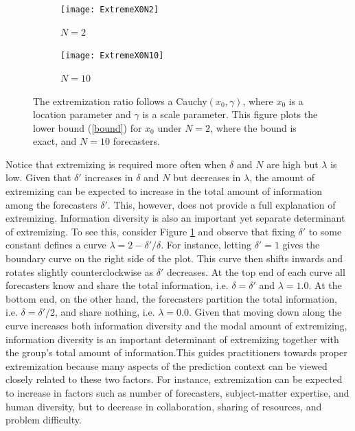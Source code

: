 \documentclass[11pt]{article}
\theoremstyle{definition}
\theoremstyle{definition}
\begin{document}
\begin{figure}[t]
\hspace{-1.2em}
    \centering
    \begin{subfigure}[b]{0.48\textwidth}
        \texttt{[image: ExtremeX0N2]}
\caption{$N = 2$}	
\label{xOracle2}
    \end{subfigure}%
    \begin{subfigure}[b]{0.48\textwidth}
        \texttt{[image: ExtremeX0N10]}
\caption{$N = 10$}	
\label{xOracle10}
    \end{subfigure}%
    \caption{ The extremization ratio follows a 
Cauchy$(x_0, \gamma)$, where $x_0$ is a location parameter and $\gamma$ 
is a scale parameter.  This figure plots the lower bound (\ref{bound}) for $x_0$ under $N = 2$, where the bound is exact, and $N = 10$ forecasters.}
        \label{LevelplotsOracle}
\end{figure}
 Notice that extremizing is required more often when $\delta$ and $N$
are high but $\lambda$ is low.  Given that $\delta'$ increases in
$\delta$ and $N$ but decreases in $\lambda$, the amount of extremizing
can be expected to increase in the total amount of information among
the forecasters $\delta'$.  This, however, does not provide a full
explanation of extremizing.  Information diversity is also an
important yet separate determinant of extremizing.  To see this,
consider Figure \ref{xOracle2} and observe that fixing $\delta'$ to
some constant defines a curve $\lambda = 2 - \delta'/\delta$. For
instance, letting $\delta' = 1$ gives the boundary curve on the right
side of the plot.  This curve then shifts inwards and rotates slightly
counterclockwise as $\delta'$ decreases.  At the top end of each curve
all forecasters know and share the total information, i.e. $\delta =
\delta'$ and $\lambda = 1.0$.  At the bottom end, on the other hand,
the forecasters partition the total information, i.e. $\delta =
\delta'/2$, and share nothing, i.e. $\lambda = 0.0$.  Given that
moving down along the curve increases both information diversity and
the modal amount of extremizing, information diversity is an important
determinant of extremizing together with the group's total amount of
information.This guides practitioners towards proper extremization
because many aspects of the prediction context can be viewed closely
related to these two factors. For instance, extremization can be
expected to increase in factors such as number of forecasters,
subject-matter expertise, and human diversity, but to decrease in
collaboration, sharing of resources, and problem difficulty.
\end{document}
